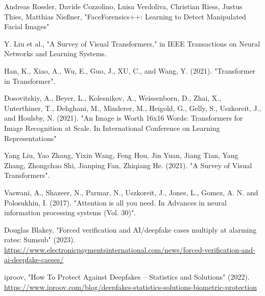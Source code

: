 \begin{thebibliography}{99}

     Andreas Rossler, Davide Cozzolino, Luisa Verdoliva, Christian Riess, Justus Thies, Matthias Nießner, "FaceForensics++: Learning to Detect Manipulated Facial Images"










     Y. Liu et al., "A Survey of Visual Transformers," in IEEE Transactions on Neural Networks and Learning Systems.

     Han, K., Xiao, A., Wu, E., Guo, J., XU, C., and Wang, Y. (2021). "Transformer in Transformer".

     Dosovitskiy, A., Beyer, L., Kolesnikov, A., Weissenborn, D., Zhai, X., Unterthiner, T., Dehghani, M., Minderer, M., Heigold, G., Gelly, S., Uszkoreit, J., and Houlsby, N. (2021). "An Image is Worth 16x16 Words: Transformers for Image Recognition at Scale. In International Conference on Learning Representations"

     Yang Liu, Yao Zhang, Yixin Wang, Feng Hou, Jin Yuan,
    Jiang Tian, Yang Zhang, Zhongchao Shi, Jianping Fan, Zhiqiang He. (2021). "A Survey of Visual Transformers".

     Vaswani, A., Shazeer, N., Parmar, N., Uszkoreit, J., Jones, L., Gomez, A. N. and Polosukhin, I. (2017). "Attention is all you need. In Advances in neural information processing systems (Vol. 30)".

     Douglas Blakey, "Forced verification and AI/deepfake cases multiply at alarming rates: Sumsub" (2023). \url{https://www.electronicpaymentsinternational.com/news/forced-verification-and-ai-deepfake-caeses/}

     iproov, "How To Protect Against Deepfakes – Statistics and Solutions" (2022). \url{https://www.iproov.com/blog/deepfakes-statistics-solutions-biometric-protection}
\end{thebibliography}
